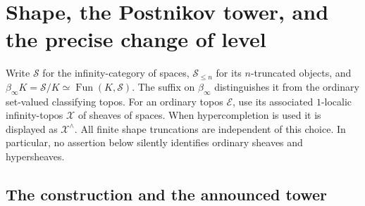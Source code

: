 \section{Shape, the Postnikov tower, and the precise change of level}
\label{sec:E}

Write $\mathcal S$ for the infinity-category of spaces, $\mathcal S_{\le n}$ for its $n$-truncated objects, and $\beta_\infty K=\mathcal S/K\simeq\operatorname{Fun}(K,\mathcal S)$. The suffix on $\beta_\infty$ distinguishes it from the ordinary set-valued classifying topos. For an ordinary topos $\mathcal E$, use its associated $1$-localic infinity-topos $\mathcal X$ of sheaves of spaces. When hypercompletion is used it is displayed as $\mathcal X^\wedge$. All finite shape truncations are independent of this choice. In particular, no assertion below silently identifies ordinary sheaves and hypersheaves.

\subsection{The construction and the announced tower}

